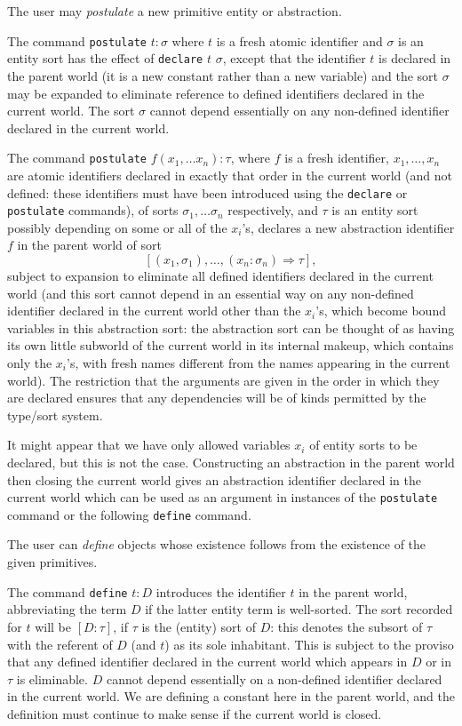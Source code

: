 \documentclass[12pt]{article}
\begin{document}
The user may {\em postulate\/} a new primitive entity or abstraction.  

The command {\tt postulate} $ t:\sigma$ where $t$ is a fresh atomic identifier and $\sigma$ is an entity sort has the effect of {\tt declare} $t$ $\sigma$, except that the identifier $t$ is declared in the parent world (it is a new constant rather than a new variable) and the sort $\sigma$ may be expanded to eliminate reference to defined identifiers declared in the current world.  The sort $\sigma$ cannot depend essentially on any non-defined identifier declared in the current world.

The command {\tt postulate} $f(x_1,\ldots x_n): \tau$, where $f$ is a fresh identifier, $x_1, \ldots, x_n$ are atomic identifiers declared in exactly that order in the current world (and not defined:  these identifiers must have been introduced using the {\tt declare} or {\tt postulate} commands), of sorts $\sigma_1,\ldots \sigma_n$ respectively, and $\tau$ is an entity sort possibly depending on some or all of the $x_i$'s, declares a new abstraction identifier $f$ in the parent world of sort  $$[(x_1,\sigma_1),\ldots,(x_n:\sigma_n) \Rightarrow \tau],$$ subject to expansion to eliminate all defined identifiers declared in the current world (and this sort cannot depend in an essential way on any non-defined identifier declared in the current world other than the $x_i$'s, which become bound variables in this abstraction sort:  the abstraction sort can be thought of as having its own little subworld of the current world in its internal makeup, which contains only the $x_i$'s, with fresh names different from the names appearing in the current world).  The restriction that the arguments are given in the order in which they are declared ensures that any dependencies will be of kinds permitted by the type/sort system.

It might appear that we have only allowed variables $x_i$ of entity sorts to be declared, but  this is not the case.   Constructing an abstraction in the parent world
then closing the current world gives an abstraction identifier declared in the current world which can be used as an argument in instances of the {\tt postulate} command or the following {\tt define} command.

The user can {\em define} objects whose existence follows from the existence of the given primitives.

The command {\tt define} $t:D$ introduces the identifier $t$ in the parent world, abbreviating the term $D$ if the latter entity term is well-sorted.  The sort recorded for $t$ will be $[D:\tau]$, if $\tau$ is the (entity) sort of $D$:  this denotes the subsort of $\tau$ with the referent of $D$ (and $t$) as its sole inhabitant. This is subject to the proviso that any defined identifier declared in the current world which appears in $D$ or
in $\tau$ is eliminable.  $D$ cannot depend essentially on a non-defined identifier declared in the current world.  We are defining a constant here in the parent world, and the definition
must continue to make sense if the current world is closed.
\end{document}
